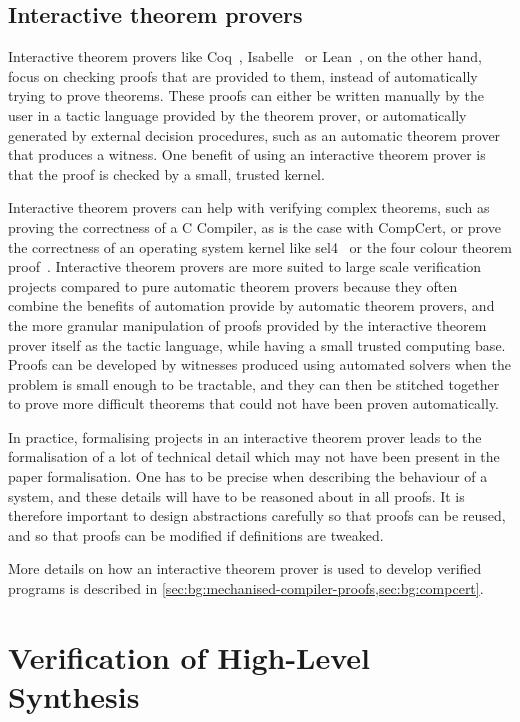 \subsection{Interactive theorem provers}%
\label{sec:bg:interactive-theorem-provers}

Interactive theorem provers like
Coq~\cite[]{bertot04_inter_theor_provin_progr_devel},
Isabelle~\cite[]{paulson94_i} or Lean~\cite[]{moura15_l}, on the other hand,
focus on checking proofs that are provided to them, instead of automatically
trying to prove theorems.  These proofs can either be written manually by the
user in a tactic language provided by the theorem prover, or automatically
generated by external decision procedures, such as an automatic theorem prover
that produces a witness.  One benefit of using an interactive theorem prover is
that the proof is checked by a small, trusted kernel.

Interactive theorem provers can help with verifying complex theorems, such as
proving the correctness of a C Compiler, as is the case with CompCert, or prove
the correctness of an operating system kernel like sel4~\cite{klein09_sel4} or
the four colour theorem proof~\cite[]{gonthier08_fp}.  Interactive theorem
provers are more suited to large scale verification projects compared to pure
automatic theorem provers because they often combine the benefits of automation
provide by automatic theorem provers, and the more granular manipulation of
proofs provided by the interactive theorem prover itself as the tactic language,
while having a small trusted computing base.  Proofs can be developed by
witnesses produced using automated solvers when the problem is small enough to
be tractable, and they can then be stitched together to prove more difficult
theorems that could not have been proven automatically.

In practice, formalising projects in an interactive theorem prover leads to the
formalisation of a lot of technical detail which may not have been present in
the paper formalisation.  One has to be precise when describing the behaviour of
a system, and these details will have to be reasoned about in all proofs.  It is
therefore important to design abstractions carefully so that proofs can be
reused, and so that proofs can be modified if definitions are tweaked.

More details on how an interactive theorem prover is used to develop verified
programs is described in
\cref{sec:bg:mechanised-compiler-proofs,sec:bg:compcert}.

\section{Verification of High-Level Synthesis}

